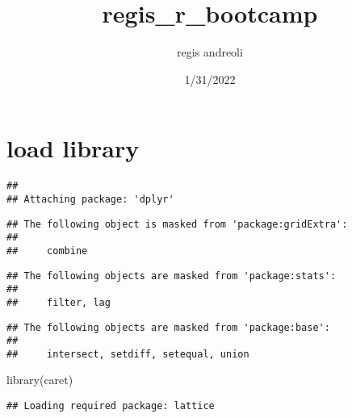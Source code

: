 \documentclass[
]{article}
\title{regis\_r\_bootcamp}
\author{regis andreoli}
\date{1/31/2022}
\newenvironment{Shaded}{\begin{snugshade}}{\end{snugshade}}
\newcommand{\AttributeTok}[1]{\textcolor[rgb]{0.77,0.63,0.00}{#1}}
\newcommand{\ConstantTok}[1]{\textcolor[rgb]{0.00,0.00,0.00}{#1}}
\newcommand{\FunctionTok}[1]{\textcolor[rgb]{0.00,0.00,0.00}{#1}}
\newcommand{\NormalTok}[1]{#1}
\newcommand{\SpecialCharTok}[1]{\textcolor[rgb]{0.00,0.00,0.00}{#1}}
\begin{document}
\maketitle

{
\setcounter{tocdepth}{4}
\tableofcontents
}
\hypertarget{load-library}{%
\section{load library}\label{load-library}}

\begin{Shaded}
\end{Shaded}

\begin{verbatim}
## 
## Attaching package: 'dplyr'
\end{verbatim}

\begin{verbatim}
## The following object is masked from 'package:gridExtra':
## 
##     combine
\end{verbatim}

\begin{verbatim}
## The following objects are masked from 'package:stats':
## 
##     filter, lag
\end{verbatim}

\begin{verbatim}
## The following objects are masked from 'package:base':
## 
##     intersect, setdiff, setequal, union
\end{verbatim}

\begin{Shaded}
\begin{Highlighting}[]
\FunctionTok{library}\NormalTok{(caret)}
\end{Highlighting}
\end{Shaded}

\begin{verbatim}
## Loading required package: lattice
\end{verbatim}
\end{document}
